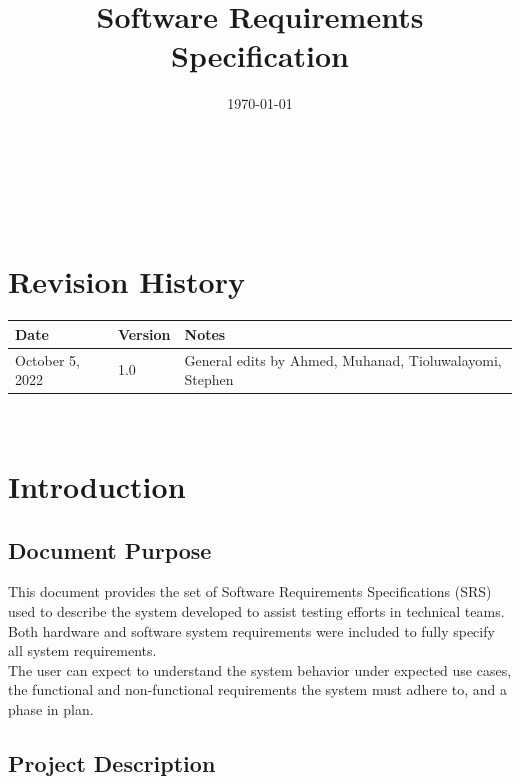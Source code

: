 \documentclass[12pt]{article}
\begin{document}
\title{Software Requirements Specification \\ \progname} 

\author{\authname}
\date{\today}
	
\maketitle

~\newpage


\tableofcontents
\listoftables
\listoffigures

~\newpage

\section*{Revision History}

\begin{tabularx}{\textwidth}{p{3cm}p{2cm}X}
\toprule {\bf Date} & {\bf Version} & {\bf Notes}\\
\midrule
October 5, 2022 & 1.0 & General edits by Ahmed, Muhanad, Tioluwalayomi, Stephen\\
\bottomrule
\end{tabularx}

~\newpage

\section{Introduction}

\subsection{Document Purpose}

This document provides the set of Software Requirements Specifications (SRS) used to describe the system developed to assist testing efforts in technical teams. Both hardware and software system requirements were included to fully specify all system requirements. \\

The user can expect to understand the system behavior under expected use cases, the functional and non-functional requirements the system must adhere to, and a phase in plan.\\

\subsection{Project Description}
\end{document}

